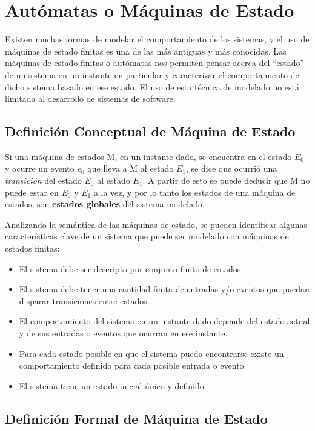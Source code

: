 \section{Autómatas o Máquinas de Estado}

Existen muchas formas de modelar el comportamiento de los sistemas, y el uso de
máquinas de estado finitas es una de las más antiguas y más conocidas.
Las máquinas de estado finitas o autómatas nos permiten pensar acerca del
``estado'' de un sistema en un instante en particular y caracterizar el comportamiento de dicho
sistema basado en ese estado. El uso de esta técnica de modelado no está
limitada al desarrollo de sistemas de software.\cite{FSM_Wright}

\subsection{Definición Conceptual de Máquina de Estado}

Si una máquina de estados M, en un instante dado, se encuentra en el estado
$E_{0}$ y ocurre un evento $e_{0}$ que lleva a M al estado $E_{1}$, se
dice que ocurrió una \textit{transición} del estado $E_{0}$ al estado
$E_{1}$.
A partir de esto se puede deducir que M no puede estar en $E_{0}$ y $E_{1}$
a la vez, y por lo tanto los estados de una máquina de estados, son
\textbf{estados globales} del sistema modelado.

Analizando la semántica de las máquinas de estado, se pueden
identificar algunas características clave de un sistema que puede ser modelado con máquinas de
estados finitas:
\begin{itemize}
  \item El sistema debe ser descripto por conjunto finito de estados.
  \item El sistema debe tener una cantidad finita de entradas y/o eventos que
  puedan disparar transiciones entre estados.
  \item El comportamiento del sistema en un instante dado depende del estado
  actual y de sus entradas o eventos que ocurran en ese instante.
  \item Para cada estado posible en que el sistema pueda encontrarse existe un
  comportamiento definido para cada posible entrada o evento.
  \item El sistema tiene un estado inicial único y definido.
\end{itemize} \cite{FSM_Wright}

\subsection{Definición Formal de Máquina de Estado}

